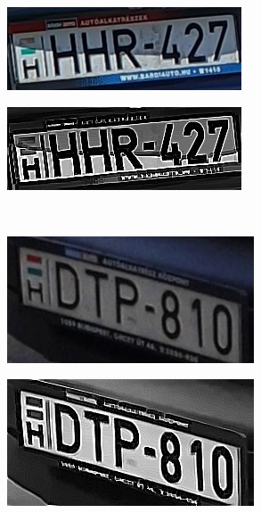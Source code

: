 \begin{figure}
    \begin{subfigure}[b]{.45\textwidth}
        \includegraphics[width=\textwidth]{figures/preprocessbefore1.jpg}
    \end{subfigure}
    \hfill
    \begin{subfigure}[b]{.45\textwidth}
        \includegraphics[width=\textwidth]{figures/preprocessafter1.jpg}
    \end{subfigure}
    \hfill
    \\
    \begin{subfigure}[b]{.45\textwidth}
        \includegraphics[width=\textwidth]{figures/preprocessbefore2.jpg}
    \end{subfigure}
    \hfill
    \begin{subfigure}[b]{.45\textwidth}
        \includegraphics[width=\textwidth]{figures/preprocessafter2.jpg}

\end{subfigure}
\end{figure}
